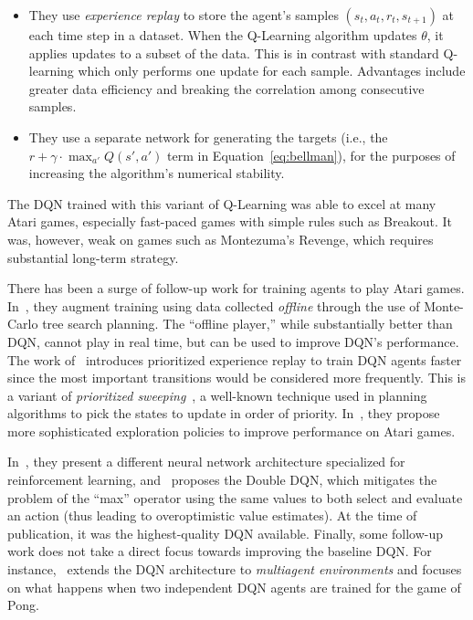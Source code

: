 \documentclass[letterpaper, 10 pt, conference]{ieeeconf}  %
\begin{document}
\begin{itemize}
    \item They use \emph{experience replay} to store the agent's samples $(s_t,a_t,r_t,s_{t+1})$ at
    each time step in a dataset. When the Q-Learning algorithm updates $\theta$, it applies updates
    to a subset of the data. This is in contrast with standard Q-learning which only performs one
    update for each sample. Advantages include greater data efficiency and breaking the correlation
    among consecutive samples.
    \item They use a separate network for generating the targets (i.e., the $r + \gamma \cdot
    \max_{a'}Q(s',a')$ term in Equation~\ref{eq:bellman}), for the purposes of increasing the
    algorithm's numerical stability.
\end{itemize}

The DQN trained with this variant of Q-Learning was able to excel at many Atari games, especially
fast-paced games with simple rules such as Breakout. It was, however, weak on games such as
Montezuma's Revenge, which requires substantial long-term strategy.

There has been a surge of follow-up work for training agents to play Atari games.
In~\cite{nips-atari-2014}, they augment training using data collected \emph{offline} through the use
of Monte-Carlo tree search planning. The ``offline player,'' while substantially better than DQN,
cannot play in real time, but can be used to improve DQN's performance. The work
of~\cite{schaul2015prioritized} introduces prioritized experience replay to train DQN agents faster
since the most important transitions would be considered more frequently. This is a variant of
\emph{prioritized sweeping}~\cite{Moore93prioritizedsweeping}, a well-known technique used in
planning algorithms to pick the states to update in order of priority.
In~\cite{stadie2015incentivizing}, they propose more sophisticated exploration policies to improve
performance on Atari games.

In~\cite{wang2015dueling}, they present a different neural network architecture specialized for
reinforcement learning, and~\cite{van2015deep} proposes the Double DQN, which mitigates the problem
of the ``max'' operator using the same values to both select and evaluate an action (thus leading to
overoptimistic value estimates). At the time of publication, it was the highest-quality DQN
available. Finally, some follow-up work does not take a direct focus towards improving the baseline
DQN. For instance,~\cite{tampuu2015multiagent} extends the DQN architecture to \emph{multiagent
environments} and focuses on what happens when two independent DQN agents are trained for the game
of Pong.
\end{document}
